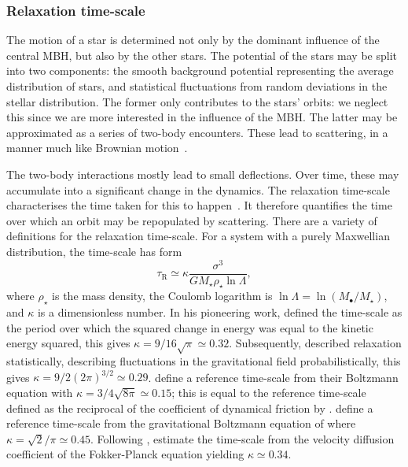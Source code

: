 \documentclass[useAMS,usedcolumn,usegraphicx,usenatbib]{mn2e}
\newcommand{\sub}[1]{\ensuremath{_\mathrm{#1}}}
\begin{document}
\subsubsection{Relaxation time-scale}\label{sec:Relax}

The motion of a star is determined not only by the dominant influence of the central MBH, but also by the other stars. The potential of the stars may be split into two components: the smooth background potential representing the average distribution of stars, and statistical fluctuations from random deviations in the stellar distribution. The former only contributes to the stars' orbits: we neglect this since we are more interested in the influence of the MBH. The latter may be approximated as a series of two-body encounters. These lead to scattering, in a manner much like Brownian motion~\citep{Bekenstein1992,Maoz1993,Nelson1999}.

The two-body interactions mostly lead to small deflections. Over time, these may accumulate into a significant change in the dynamics. The relaxation time-scale characterises the time taken for this to happen~\citep{Binney1987}. It therefore quantifies the time over which an orbit may be repopulated by scattering. There are a variety of definitions for the relaxation time-scale. For a system with a purely Maxwellian distribution, the time-scale has form
\begin{equation}
\tau\sub{R} \simeq \kappa\frac{\sigma^3}{GM_\star\rho_\star\ln\Lambda},
\end{equation}
where $\rho_\star$ is the mass density, the Coulomb logarithm is $\ln\Lambda = \ln(M_\bullet/M_\star)$, and $\kappa$ is a dimensionless number. In his pioneering work, \citet{Chandrasekhar1941, Chandrasekhar1960} defined the time-scale as the period over which the squared change in energy was equal to the kinetic energy squared, this gives $\kappa = 9/16\sqrt{\pi} \simeq 0.32$. Subsequently, \citet{Chandrasekhar1941a} described relaxation statistically, describing fluctuations in the gravitational field probabilistically, this gives $\kappa = 9/2(2\pi)^{3/2} \simeq 0.29$. \citet{Bahcall1977} define a reference time-scale from their Boltzmann equation with $\kappa = 3/4\sqrt{8\pi} \simeq 0.15$; this is equal to the reference time-scale defined as the reciprocal of the coefficient of dynamical friction by \citet{Chandrasekhar1943a, Chandrasekhar1943}. \citet{Spitzer1958} define a reference time-scale from the gravitational Boltzmann equation of \citet{Spitzer1951} where $\kappa = \sqrt{2}/\pi \simeq 0.45$. Following \citet{Spitzer1971}, \citet[section 8.3.4]{Binney1987} estimate the time-scale from the velocity diffusion coefficient of the Fokker-Planck equation yielding $\kappa \simeq 0.34$.
\end{document}

